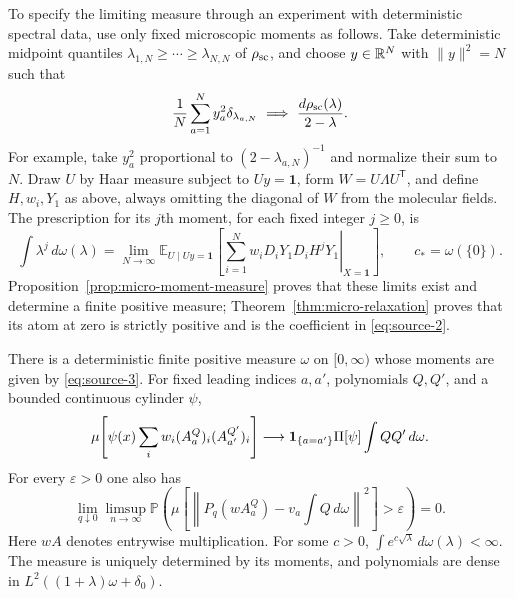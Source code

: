 To specify the limiting measure through an experiment with deterministic
spectral data, use only fixed microscopic moments as follows.
Take deterministic midpoint quantiles
$\lambda_{1,N}\ge\cdots\ge\lambda_{N,N}$ of $\rho_{\rm sc}$, and choose
$y\in\mathbb R^N$ with $\|y\|^2=N$ such that
\[
 \frac1N\sum_{a=1}^N y_a^2\delta_{\lambda_{a,N}}
 \ \Longrightarrow\ \frac{d\rho_{\rm sc}(\lambda)}{2-\lambda}.
\]
For example, take $y_a^2$ proportional to $(2-\lambda_{a,N})^{-1}$ and
normalize their sum to $N$.  Draw $U$ by Haar measure subject to
$Uy=\mathbf1$, form $W=U\Lambda U^{\mathsf T}$, and define $H,w_i,Y_1$
as above, always omitting the diagonal of $W$ from the molecular fields.
The prescription for its $j$th moment, for each fixed integer $j\ge0$, is
\begin{equation}\label{eq:source-3}
 \int\lambda^j\,d\omega(\lambda)
 =\lim_{N\to\infty}\mathbb E_{U\mid Uy=\mathbf1}
 \left[\left.\sum_{i=1}^N
 w_iD_iY_1D_iH^jY_1\right|_{X=\mathbf1}\right],
 \qquad c_*=\omega(\{0\}).
\end{equation}
Proposition~\ref{prop:micro-moment-measure} proves that these limits exist
and determine a finite positive measure; Theorem~\ref{thm:micro-relaxation}
proves that its atom at zero is strictly positive and is the coefficient in
\eqref{eq:source-2}.

\begin{proposition}
\label{prop:micro-moment-measure}
There is a deterministic finite positive measure $\omega$ on $[0,\infty)$
whose moments are given by \eqref{eq:source-3}. For fixed leading indices
$a,a'$, polynomials $Q,Q'$, and a bounded continuous cylinder $\psi$,
\begin{equation}
 \mu\!\left[\psi(x)\sum_iw_i(A_a^Q)_i(A_{a'}^{Q'})_i\right]
 \longrightarrow
 \mathbf 1_{\{a=a'\}}\Pi[\psi]\int QQ'\,d\omega.
 \label{eq:source-32}
\end{equation}
For every $\varepsilon>0$ one also has
\begin{equation}
 \lim_{q\downarrow0}\limsup_{n\to\infty}
 \mathbb P\!\left(
  \mu\!\left[\left\|P_q(wA_a^Q)-v_a\int Q\,d\omega\right\|^2\right]
      >\varepsilon\right)=0.
 \label{eq:source-33}
\end{equation}
Here $wA$ denotes entrywise multiplication. For some $c>0$,
$\int e^{c\sqrt\lambda}\,d\omega(\lambda)<\infty$. The measure is uniquely
determined by its moments, and polynomials are dense in
$L^2((1+\lambda)\omega+\delta_0)$.
\end{proposition}

